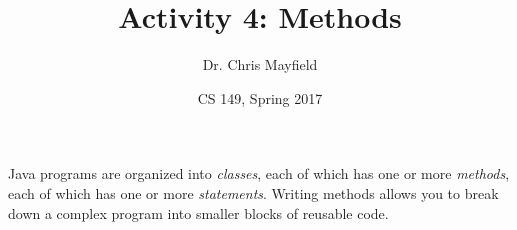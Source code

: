 \documentclass[12pt]{article}
\title{Activity 4: Methods}
\author{Dr. Chris Mayfield}
\date{CS 149, Spring 2017}
\begin{document}
\maketitle

Java programs are organized into {\em classes}, each of which has one or more {\em methods}, each of which has one or more {\em statements}.
Writing methods allows you to break down a complex program into smaller blocks of reusable code.




\end{document}
